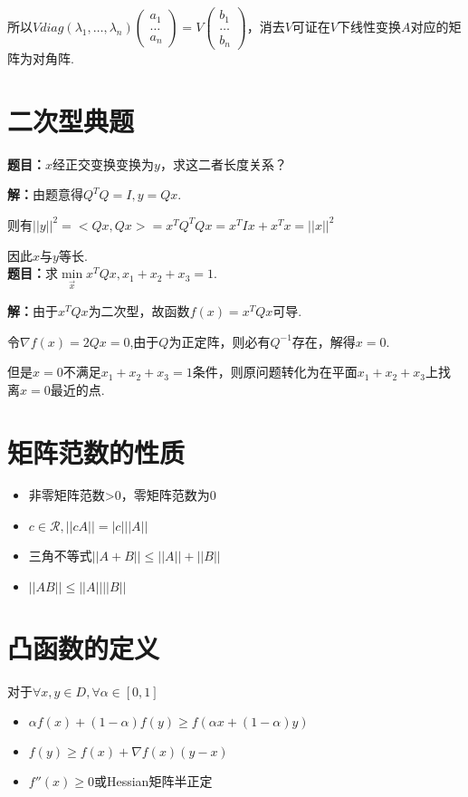 \documentclass{article}
\begin{document}
所以$Vdiag(\lambda_1,\dots,\lambda_n)\left(
    \begin{array}{c}
        a_1 \\
        \dots \\
        a_n
    \end{array}
\right)=V\left(
    \begin{array}{c}
        b_1 \\
        \dots \\
        b_n
    \end{array}
\right)$，消去$V$可证在$V$下线性变换$A$对应的矩阵为对角阵.
\section{二次型典题}
\textbf{题目：}$x$经正交变换变换为$y$，求这二者长度关系？

\textbf{解：}由题意得$Q^TQ=I,y=Qx$.

则有$||y||^2 =<Qx,Qx>=x^TQ^TQx=x^TIx+x^Tx=||x||^2$

因此$x$与$y$等长.\\

\textbf{题目：}求$\mathop{min}\limits_{\vec{x}}x^TQx, x_1+x_2+x_3=1$.

\textbf{解：}由于$x^TQx$为二次型，故函数$f(x)=x^TQx$可导.

令$\nabla f(x)=2Qx=0$,由于$Q$为正定阵，则必有$Q^{-1}$存在，解得$x=0$.

但是$x=0$不满足$x_1+x_2+x_3=1$条件，则原问题转化为在平面$x_1+x_2+x_3$上找离$x=0$最近的点.
\section{矩阵范数的性质}
\begin{itemize}
    \item 非零矩阵范数>0，零矩阵范数为0
    \item $c\in \mathcal{R},||cA||=|c| ||A||$
    \item 三角不等式$||A+B||\leq||A||+||B||$
    \item $||AB||\leq||A|| ||B||$
\end{itemize}

\section{凸函数的定义}
对于$\forall x,y\in D,\forall\alpha\in [0,1]$
\begin{itemize}
    \item $\alpha f(x)+(1-\alpha)f(y)\geq f(\alpha x+(1-\alpha)y)$
    \item $f(y)\geq f(x)+\nabla f(x)(y-x)$
    \item $f''(x)\geq 0$或Hessian矩阵半正定
\end{itemize}
\end{document}
